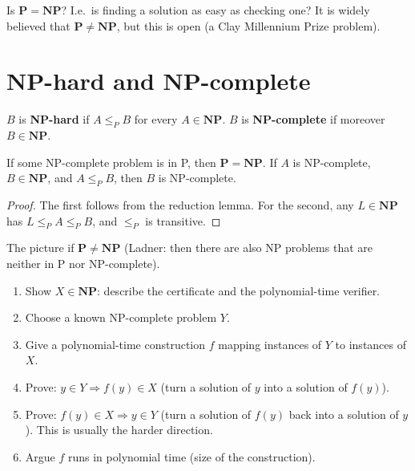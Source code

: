 \begin{important}
Is $\mathbf P=\mathbf{NP}$? I.e.\ is finding a solution as easy as checking one? It is widely believed that $\mathbf P\ne\mathbf{NP}$, but this is open
(a Clay Millennium Prize problem).
\end{important}

\section{NP-hard and NP-complete}
\begin{definition}
$B$ is \textbf{NP-hard} if $A\le_PB$ for every $A\in\mathbf{NP}$. $B$ is \textbf{NP-complete} if moreover $B\in\mathbf{NP}$.
\end{definition}
\begin{lemma}
If some NP-complete problem is in P, then $\mathbf P=\mathbf{NP}$. If $A$ is NP-complete, $B\in\mathbf{NP}$, and $A\le_PB$, then $B$ is NP-complete.
\end{lemma}
\begin{proof}
The first follows from the reduction lemma. For the second, any $L\in\mathbf{NP}$ has $L\le_PA\le_PB$, and $\le_P$ is transitive.
\end{proof}

\begin{center}

{\small The picture if $\mathbf P\ne\mathbf{NP}$ (Ladner: then there are also NP problems that are neither in P nor NP-complete).}
\end{center}

\begin{important}
\begin{enumerate}
  \item Show $X\in\mathbf{NP}$: describe the certificate and the polynomial-time verifier.
  \item Choose a known NP-complete problem $Y$.
  \item Give a polynomial-time construction $f$ mapping instances of $Y$ to instances of $X$.
  \item Prove: $y\in Y\Rightarrow f(y)\in X$ (turn a solution of $y$ into a solution of $f(y)$).
  \item Prove: $f(y)\in X\Rightarrow y\in Y$ (turn a solution of $f(y)$ back into a solution of $y$). This is usually the harder direction.
  \item Argue $f$ runs in polynomial time (size of the construction).
\end{enumerate}
\end{important}

